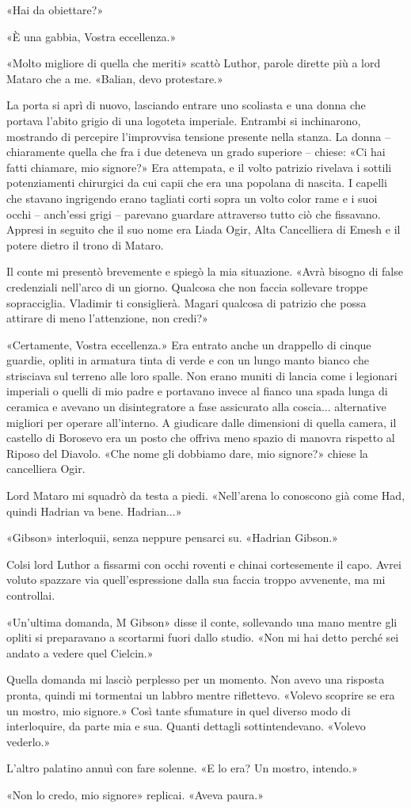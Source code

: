 «Hai da obiettare?»

«È una gabbia, Vostra eccellenza.»

«Molto migliore di quella che meriti» scattò Luthor, parole dirette più
a lord Mataro che a me. «Balian, devo protestare.»

La porta si aprì di nuovo, lasciando entrare uno scoliasta e una donna
che portava l'abito grigio di una logoteta imperiale. Entrambi si
inchinarono, mostrando di percepire l'improvvisa tensione presente nella
stanza. La donna -- chiaramente quella che fra i due deteneva un grado
superiore -- chiese: «Ci hai fatti chiamare, mio signore?» Era
attempata, e il volto patrizio rivelava i sottili potenziamenti
chirurgici da cui capii che era una popolana di nascita. I capelli che
stavano ingrigendo erano tagliati corti sopra un volto color rame e i
suoi occhi -- anch'essi grigi -- parevano guardare attraverso tutto ciò
che fissavano. Appresi in seguito che il suo nome era Liada Ogir, Alta
Cancelliera di Emesh e il potere dietro il trono di Mataro.

Il conte mi presentò brevemente e spiegò la mia situazione. «Avrà
bisogno di false credenziali nell'arco di un giorno. Qualcosa che non
faccia sollevare troppe sopracciglia. Vladimir ti consiglierà. Magari
qualcosa di patrizio che possa attirare di meno l'attenzione, non
credi?»

«Certamente, Vostra eccellenza.» Era entrato anche un drappello di
cinque guardie, opliti in armatura tinta di verde e con un lungo manto
bianco che strisciava sul terreno alle loro spalle. Non erano muniti di
lancia come i legionari imperiali o quelli di mio padre e portavano
invece al fianco una spada lunga di ceramica e avevano un disintegratore
a fase assicurato alla coscia... alternative migliori per operare
all'interno. A giudicare dalle dimensioni di quella camera, il castello
di Borosevo era un posto che offriva meno spazio di manovra rispetto al
Riposo del Diavolo. «Che nome gli dobbiamo dare, mio signore?» chiese la
cancelliera Ogir.

Lord Mataro mi squadrò da testa a piedi. «Nell'arena lo conoscono già
come Had, quindi Hadrian va bene. Hadrian...»

«Gibson» interloquii, senza neppure pensarci su. «Hadrian Gibson.»

Colsi lord Luthor a fissarmi con occhi roventi e chinai cortesemente il
capo. Avrei voluto spazzare via quell'espressione dalla sua faccia
troppo avvenente, ma mi controllai.

«Un'ultima domanda, M Gibson» disse il conte, sollevando una mano mentre
gli opliti si preparavano a scortarmi fuori dallo studio. «Non mi hai
detto perché sei andato a vedere quel Cielcin.»

Quella domanda mi lasciò perplesso per un momento. Non avevo una
risposta pronta, quindi mi tormentai un labbro mentre riflettevo.
«Volevo scoprire se era un mostro, mio signore.» Così tante sfumature in
quel diverso modo di interloquire, da parte mia e sua. Quanti dettagli
sottintendevano. «Volevo vederlo.»

L'altro palatino annuì con fare solenne. «E lo era? Un mostro, intendo.»

«Non lo credo, mio signore» replicai. «Aveva paura.»


